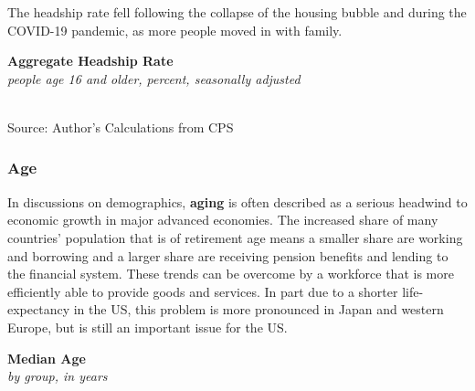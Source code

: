 \documentclass{report}
\makeatletter
\newcommand{\tbllink}[1]{\href{https://raw.githubusercontent.com/bdecon/US-chartbook/master/chartbook/data/#1}{\faTable}}
\newcommand*\short[1]{\expandafter\@gobbletwo\number\numexpr#1\relax}
\newcommand{\shdateaxisticks}{
		date coordinates in=x, axis line style={draw=none},
		xmax={2023-10-01},
		max space between ticks=40,	    
		xtick={{1990-01-01}, {1995-01-01}, {2000-01-01}, 
			{2005-01-01}, {2010-01-01}, {2015-01-01}, {2020-01-01}},
		minor xtick={},
		enlarge y limits={0.06}, enlarge x limits={0.01},
		}
\newcommand{\stdline}[4]{\addplot[very thick, no markers, color=#1] 
		table [x=#2, y=#3, col sep=comma] {#4};	}
\newcommand{\rebars}{
		\fill[color=black!10] (axis cs:{2007-12-01},\pgfkeysvalueof{/pgfplots/ymin}) rectangle 
			(axis cs:{2009-07-01}, \pgfkeysvalueof{/pgfplots/ymax});
		\fill[color=black!10] (axis cs:{2001-03-01},\pgfkeysvalueof{/pgfplots/ymin}) rectangle 
			(axis cs:{2001-11-01}, \pgfkeysvalueof{/pgfplots/ymax});
		\fill[color=black!10] (axis cs:{2020-02-01},\pgfkeysvalueof{/pgfplots/ymin}) rectangle 
			(axis cs:{2020-05-01}, \pgfkeysvalueof{/pgfplots/ymax});}
\makeatother
\begin{document}
{\begin{minipage}{0.25\textwidth}
\small The headship rate fell following the collapse of the housing bubble and during the COVID-19 pandemic, as more people moved in with family. 
\end{minipage}\hspace{6mm}
\begin{minipage}{0.47\textwidth}
\normalsize \textbf{Aggregate Headship Rate}\\
\footnotesize{\textit{people age 16 and older, percent, seasonally adjusted}}\\
\hspace*{-2mm} \\
\footnotesize{Source: Author's Calculations from CPS} \hfill \tbllink{headship.csv} 
\end{minipage}
\newpage
\begin{minipage}{0.76\textwidth} 
\subsubsection*{Age}
\small In discussions on demographics, \textbf{aging} is often described as a serious headwind to economic growth in major advanced economies. The increased share of many countries' population that is of retirement age means a smaller share are working and borrowing and a larger share are receiving pension benefits and lending to the financial system. These trends can be overcome by a workforce that is more efficiently able to provide goods and services. In part due to a shorter life-expectancy in the US, this problem is more pronounced in Japan and western Europe, but is still an important issue for the US.

\begin{minipage}{0.41\textwidth}
\small 
\end{minipage}\hfill
\begin{minipage}{0.53\textwidth}
\normalsize \textbf{Median Age}\\
\footnotesize{\textit{by group, in years}}
\vspace{4.0cm}


\end{minipage}
\end{minipage}}
\end{document}
